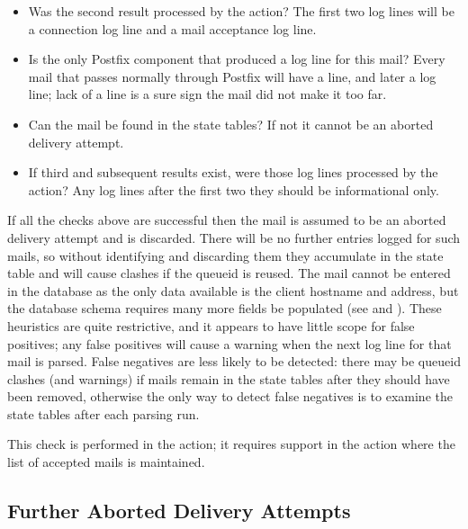 \begin{itemize}

    \item Was the second result processed by the  action?
        The first two  log lines will be a connection log
        line and a mail acceptance log line.

    \item Is  the only Postfix component that produced a log
        line for this mail?  Every mail that passes normally through
        Postfix will have a  line, and later a
         log line; lack of a  line is a sure
        sign the mail did not make it too far.

    \item Can the mail be found in the state tables?  If not it cannot be
        an aborted delivery attempt.

    \item If third and subsequent results exist, were those log lines
        processed by the  action?  Any log lines after
        the first two they should be informational only.

\end{itemize}

If all the checks above are successful then the mail is assumed to be an
aborted delivery attempt and is discarded.  There will be no further
entries logged for such mails, so without identifying and discarding them
they accumulate in the state table and will cause clashes if the queueid is
reused.  The mail cannot be entered in the database as the only data
available is the client hostname and  address, but the database
schema requires many more fields be populated (see  and ).  These heuristics are quite
restrictive, and it appears to have little scope for false positives; any
false positives will cause a warning when the next log line for that mail
is parsed.  False negatives are less likely to be detected: there may be
queueid clashes (and warnings) if mails remain in the state tables after
they should have been removed, otherwise the only way to detect false
negatives is to examine the state tables after each parsing run.

This check is performed in the  action; it requires
support in the  action where the list of accepted mails is
maintained.


\subsection{Further Aborted Delivery Attempts}

